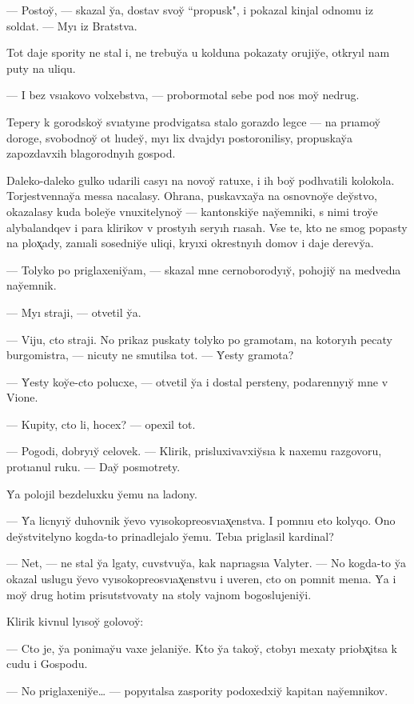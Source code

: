 \documentclass[10pt]{book}
\begin{document}
— Postoy̆, — skazal y̆a, dostav svoy̆ ``propusk", i pokazal kinjal odnomu iz soldat. — Myı iz Bratstva.

Tot daje spority ne stal i, ne trebuy̆a u kolduna pokazaty orujiy̆e, otkryıl nam puty na uliqu.

— I bez vsıakovo volxebstva, — probormotal sebe pod nos moy̆ nedrug.

Tepery k gorodskoy̆ svıatyıne prodvigatsa stalo gorazdo legce — na prıamoy̆ doroge, svobodnoy̆ ot lıudey̆, myı lix dvajdyı postoronilisy, propuskay̆a zapozdavxih blagorodnyıh gospod.

Daleko-daleko gulko udarili casyı na novoy̆ ratuxe, i ih boy̆ podhvatili kolokola. Torjestvennay̆a messa nacalasy. Ohrana, puskavxay̆a na osnovnoy̆e dey̆stvo, okazalasy kuda boley̆e vnuxitelynoy̆ — kantonskiy̆e nay̆emniki, s nimi troy̆e alybalandqev i para klirikov v prostyıh seryıh rıasah. Vse te, kto ne smog popasty na plox̨ady, zanıali sosedniy̆e uliqi, kryıxi okrestnyıh domov i daje derevy̆a.

— Tolyko po priglaxeniy̆am, — skazal mne cernoborodyıy̆, pohojiy̆ na medvedıa nay̆emnik.

— Myı straji, — otvetil y̆a.

— Viju, cto straji. No prikaz puskaty tolyko po gramotam, na kotoryıh pecaty burgomistra, — nicuty ne smutilsa tot. — Y̆esty gramota?

— Y̆esty koy̆e-cto polucxe, — otvetil y̆a i dostal persteny, podarennyıy̆ mne v Vione.

— Kupity, cto li, hocex? — opexil tot.

— Pogodi, dobryıy̆ celovek. — Klirik, prisluxivavxiy̆sıa k naxemu razgovoru, protıanul ruku. — Day̆ posmotrety.

Y̆a polojil bezdeluxku y̆emu na ladony.

— Y̆a licnyıy̆ duhovnik y̆evo vyısokopreosvıax̨enstva. I pomnıu eto kolyqo. Ono dey̆stvitelyno kogda-to prinadlejalo y̆emu. Tebıa priglasil kardinal?

— Net, — ne stal y̆a lgaty, cuvstvuy̆a, kak naprıagsıa Valyter. — No kogda-to y̆a okazal uslugu y̆evo vyısokopreosvıax̨enstvu i uveren, cto on pomnit menıa. Y̆a i moy̆ drug hotim prisutstvovaty na stoly vajnom bogoslujeniy̆i.

Klirik kivnul lyısoy̆ golovoy̆:

— Cto je, y̆a ponimay̆u vaxe jelaniy̆e. Kto y̆a takoy̆, ctobyı mexaty priobx̨itsa k cudu i Gospodu.

— No priglaxeniy̆e… — popyıtalsa zaspority podoxedxiy̆ kapitan nay̆emnikov.
\end{document}

